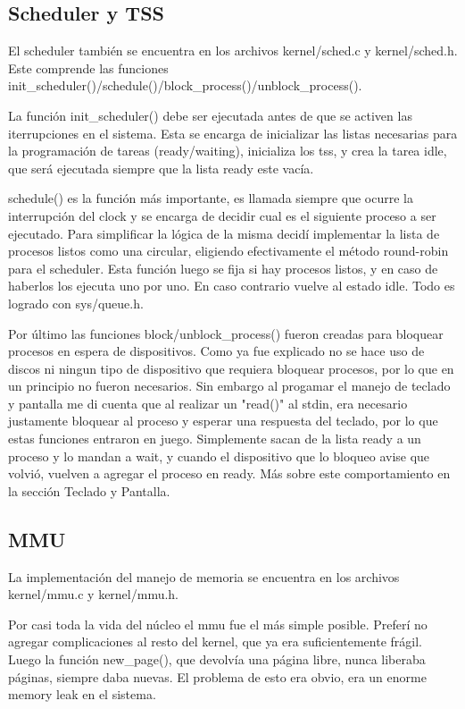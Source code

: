 \subsection{Scheduler y TSS}

El scheduler también se encuentra en los archivos kernel/sched.c y
kernel/sched.h. Este comprende las funciones
init\_scheduler()/schedule()/block\_process()/unblock\_process().

La función init\_scheduler() debe ser ejecutada antes de que se activen las
iterrupciones en el sistema. Esta se encarga de inicializar las listas
necesarias para la programación de tareas (ready/waiting), inicializa los tss,
y crea la tarea idle, que será ejecutada siempre que la lista ready este vacía.

schedule() es la función más importante, es llamada siempre que ocurre la
interrupción del clock y se encarga de decidir cual es el siguiente proceso a
ser ejecutado. Para simplificar la lógica de la misma decidí implementar la
lista de procesos listos como una circular, eligiendo efectivamente el método
round-robin para el scheduler. Esta función luego se fija si hay procesos
listos, y en caso de haberlos los ejecuta uno por uno. En caso contrario vuelve
al estado idle. Todo es logrado con sys/queue.h.

Por último las funciones block/unblock\_process() fueron creadas para bloquear
procesos en espera de dispositivos. Como ya fue explicado no se hace uso de
discos ni ningun tipo de dispositivo que requiera bloquear procesos, por lo que
en un principio no fueron necesarios. Sin embargo al progamar el manejo de
teclado y pantalla me di cuenta que al realizar un "read()" al stdin, era
necesario  justamente bloquear al proceso y esperar una respuesta del teclado,
por lo que estas funciones entraron en juego. Simplemente sacan de la lista
ready a un proceso y lo mandan a wait, y cuando el dispositivo que lo bloqueo
avise que volvió, vuelven a agregar el proceso en ready. Más sobre este
comportamiento en la sección Teclado y Pantalla.

\subsection{MMU}

La implementación del manejo de memoria se encuentra en los archivos
kernel/mmu.c y kernel/mmu.h.

Por casi toda la vida del núcleo el mmu fue el más simple posible. Preferí no
agregar complicaciones al resto del kernel, que ya era suficientemente frágil.
Luego la función new\_page(), que devolvía una página libre, nunca liberaba
páginas, siempre daba nuevas. El problema de esto era obvio, era un enorme
memory leak en el sistema.

